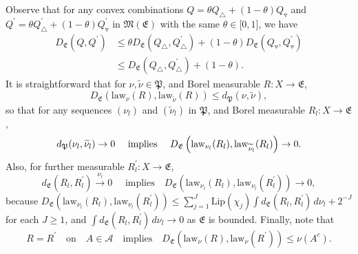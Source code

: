 \documentclass[AHL,Unicode,longabstracts]{cedram}
\newcommand{\clA}{\mathcal{A}}
\newcommand{\law}{\mathrm{law}}
\newcommand{\Lip}{\mathrm{Lip}}
\newcommand{\frkP}{\mathfrak{P}}
\newcommand{\frkE}{\mathfrak{E}}
\newcommand{\frkM}{\mathfrak{M}}
\begin{document}
Observe that for any convex combinations $Q=\theta Q_{\triangle} +(1-\theta)Q_{\triangledown}$ and $Q^{\prime}=\theta Q_{\triangle}^{\prime }+(1-\theta)Q_{\triangledown}^{\prime}$ in $\frkM(\frkE)$ with the same $\theta\in\lbrack0,1]$, we have
\begin{equation}\label{Eq_Tree2}
\begin{split}
D_{\frkE}\left(Q,Q^{\prime}\right) &\leq\theta D_{\frkE}\left(Q_{\triangle },Q_{\triangle}^{\prime}\right)+\left(1-\theta\right)D_{\frkE}\left(Q_{\triangledown},Q_{\triangledown}^{\prime}\right)\\
 &\leq D_{\frkE}\left(Q_{\triangle},Q_{\triangle}^{\prime}\right)+(1-\theta).
\end{split}
\end{equation}
It is straightforward that for $\nu,\widetilde{\nu}\in\frkP$, and Borel measurable $R:X\rightarrow\frkE$,
\begin{equation}\label{Eq_ererrewrerwrertrerwerq}
D_{\frkE}\left(\law_{\nu}(R),\law_{\widetilde{\nu}}(R)\right)\leq d_{\frkP}\left(\nu,\widetilde{\nu}\right),
\end{equation}
so that for any sequences $(\nu_{l})$ and $(\widetilde{\nu}_{l})$ in $\frkP$, and Borel measurable $R_{l}:X\rightarrow\frkE$,
\begin{equation}\label{Eq_vcbycxvcygvchatecv356463456}
d_{\frkP}(\nu_{l},\widetilde{\nu}_{l})\rightarrow0\quad \text{ implies
\quad}D_{\frkE}\left(\law_{\nu_{l}}(R_{l}),\law _{\widetilde{\nu}_{l}}(R_{l})\right)\rightarrow0.
\end{equation}
Also, for further measurable $R_{l}^{\prime}:X\rightarrow\frkE$,
\begin{equation}\label{Eq_Tree1}
d_{\frkE}\left(R_{l},R_{l}^{\prime}\right)\overset{\nu_{l}}{\longrightarrow }0\quad \text{ implies} \quad D_{\frkE}\left(\law_{\nu_{l}} \left(R_{l}\right),\law_{\nu_{l}}\left(R_{l}^{\prime}\right)\right)\rightarrow0,
\end{equation}
because $D_{\frkE}(\law_{\nu_{l}}(R_{l}),\law_{\nu_{l} }(R_{l}^{\prime}))\leq {\sum\nolimits_{j=1}^{J}}
\Lip(\chi_{j})\int d_{\frkE}(R_{l},R_{l}^{\prime})\,d\nu _{l}+2^{-J}$ for each $J\geq1$, and $\int d_{\frkE}(R_{l},R_{l} ^{\prime})\,d\nu_{l}\rightarrow0$ as $\frkE$ is bounded. Finally, note that
\begin{equation}
R=R^{\prime}\quad \text{on}\quad A\in\clA \quad\text{implies} \quad  D_{\frkE}\left(\law_{\nu}(R),\law_{\nu}\left(R^{\prime}\right)\right)\leq\nu\left(A^{c}\right).
\end{equation}
\end{document}
